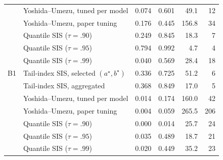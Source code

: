 \begin{table}[t]
\begin{tabular}{llrrrr}
 & Yoshida--Umezu, tuned per model & 0.074 & 0.601 & 49.1 & 12\\
 & Yoshida--Umezu, paper tuning & 0.176 & 0.445 & 156.8 & 34\\
 & Quantile SIS ($\tau=.90$) & 0.249 & 0.845 & 18.3 & 7\\
 & Quantile SIS ($\tau=.95$) & 0.794 & 0.992 & 4.7 & 4\\
 & Quantile SIS ($\tau=.99$) & 0.040 & 0.569 & 28.4 & 18\\
\addlinespace
B1 & Tail-index SIS, selected $(a^\star,b^\star)$ & 0.336 & 0.725 & 51.2 & 6\\
 & Tail-index SIS, aggregated & 0.368 & 0.849 & 17.0 & 5\\
 & Yoshida--Umezu, tuned per model & 0.014 & 0.174 & 160.0 & 42\\
 & Yoshida--Umezu, paper tuning & 0.004 & 0.059 & 265.5 & 206\\
 & Quantile SIS ($\tau=.90$) & 0.000 & 0.014 & 25.7 & 24\\
 & Quantile SIS ($\tau=.95$) & 0.035 & 0.489 & 18.7 & 21\\
 & Quantile SIS ($\tau=.99$) & 0.020 & 0.449 & 35.2 & 23\\
\bottomrule
\end{tabular}
\end{table}
